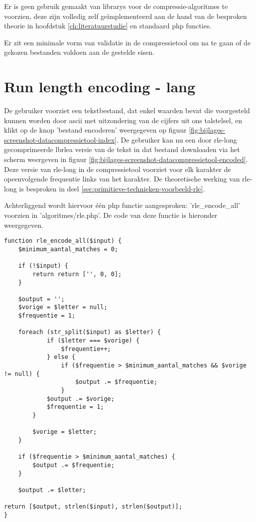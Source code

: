 Er is geen gebruik gemaakt van \glspl{library} voor de \glspl{compressie-algoritme} te voorzien, deze zijn volledig zelf geïmplementeerd aan de hand van de besproken theorie in hoofdstuk \ref{ch:literatuurstudie} en standaard \gls{php} functies.

Er zit een minimale vorm van validatie in de \gls{compressietool} om na te gaan of de gekozen bestanden voldoen aan de gestelde eisen.

\section{Run length encoding - lang}
\label{sec:compressietool-rlea}

De gebruiker voorziet een tekstbestand, dat enkel waarden bevat die voorgesteld kunnen worden door \gls{ascii} met uitzondering van de cijfers uit ons talstelsel, en klikt op de knop 'bestand encoderen' weergegeven op figuur \ref{fig:bijlages-screenshot-datacompressietool-index}. De gebruiker kan nu een door \gls{rle-long} gecomprimeerde \gls{lbrlea} versie van de tekst in dat bestand downloaden via het scherm weergeven in figuur \ref{fig:bijlages-screenshot-datacompressietool-encoded}. Deze versie van \gls{rle-long} in de \gls{compressietool} voorziet voor elk karakter de opeenvolgende frequentie links van het karakter. De theoretische werking van \gls{rle-long} is besproken in deel \ref{sec:primitieve-technieken-voorbeeld-rle}.

Achterliggend wordt hiervoor één \gls{php} functie aangesproken: 'rle\_encode\_all' voorzien in 'algoritmes/rle.php'. De code van deze functie is hieronder weergegeven.

\begin{lstlisting}
function rle_encode_all($input) {
	$minimum_aantal_matches = 0;
	
	if (!$input) {
		return return ['', 0, 0];
	}
	
	$output = '';
	$vorige = $letter = null;
	$frequentie = 1;
	
	foreach (str_split($input) as $letter) {
			if ($letter === $vorige) {
				$frequentie++;
			} else {
				if ($frequentie > $minimum_aantal_matches && $vorige != null) {
					$output .= $frequentie;
				}
			$output .= $vorige;
			$frequentie = 1;
		}
		
		$vorige = $letter;
	}
	
	if ($frequentie > $minimum_aantal_matches) {
		$output .= $frequentie;
	}
	
	$output .= $letter;

return [$output, strlen($input), strlen($output)];
}
\end{lstlisting}

